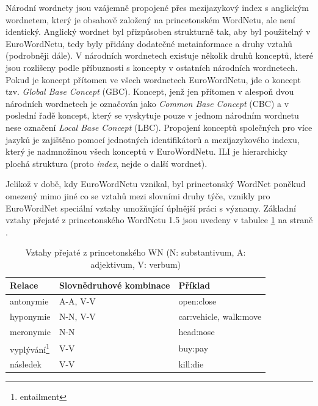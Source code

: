 \documentclass[a4paper, 11pt, oneside]{book}
\begin{document}
				Národní wordnety jsou vzájemně propojené přes mezijazykový index s anglickým wordnetem, který je obsahově založený na princetonském WordNetu, ale není identický. Anglický wordnet byl přizpůsoben strukturně tak, aby byl použitelný v EuroWordNetu, tedy byly přidány dodatečné metainformace a druhy vztahů (podrobněji dále). V národních wordnetech existuje několik druhů konceptů, které jsou rozlišeny podle příbuznosti s koncepty v ostatních národních wordnetech. Pokud je koncept přítomen ve všech wordnetech EuroWordNetu, jde o koncept tzv. \textit{Global Base Concept} (GBC). Koncept, jenž jen přítomen v alespoň dvou národních wordnetech je označován jako \textit{Common Base Concept} (CBC) a v poslední řadě koncept, který se vyskytuje pouze v jednom národním wordnetu nese označení \textit{Local Base Concept} (LBC). \parencite{gwa2013baseconcepts} Propojení konceptů společných pro více jazyků je zajištěno pomocí jednotných identifikátorů a mezijazykového indexu, který je nadmnožinou všech konceptů v EuroWordNetu. ILI je hierarchicky plochá struktura (proto \textit{index}, nejde o další  wordnet). \parencite{vossen1997eurowordnet}

				Jelikož v době, kdy EuroWordNetu vznikal, byl princetonský WordNet poněkud omezený mimo jiné co se vztahů mezi slovními druhy týče, vznikly pro EuroWordNet speciální vztahy umožňující úplnější práci s významy. Základní vztahy přejaté z princetonského WordNetu 1.5 jsou uvedeny v tabulce \ref{wn-rels} na straně \pageref{wn-rels}.

				\begin{table}[t]
					\centering
					\label{wn-rels}
					\begin{tabular}{l l l}
					Relace                           & Slovnědruhové kombinace & Příklad                \\\hline
					antonymie                        & A-A, V-V                & open:close             \\\hline
					hyponymie                        & N-N, V-V                & car:vehicle, walk:move \\\hline
					meronymie                        & N-N                     & head:nose              \\\hline
					vyplývání\footnote{entailment} & V-V                     & buy:pay                \\\hline
					následek                         & V-V                     & kill:die               
					\end{tabular}
					\caption{Vztahy přejaté z princetonského WN (N: substantivum, A: adjektivum, V: verbum)}
				\end{table}
\end{document}

